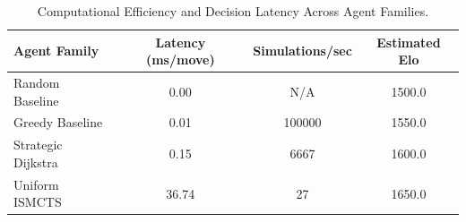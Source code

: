 \begin{table}[htbp]
\centering
\caption{Computational Efficiency and Decision Latency Across Agent Families.}
\label{tab:comp_profile}
\begin{tabular}{lccc}
\hline
\textbf{Agent Family} & \textbf{Latency (ms/move)} & \textbf{Simulations/sec} & \textbf{Estimated Elo} \\
\hline
Random Baseline & 0.00 & N/A & 1500.0 \\
Greedy Baseline & 0.01 & 100000 & 1550.0 \\
Strategic Dijkstra & 0.15 & 6667 & 1600.0 \\
Uniform ISMCTS & 36.74 & 27 & 1650.0 \\
\hline
\end{tabular}
\end{table}